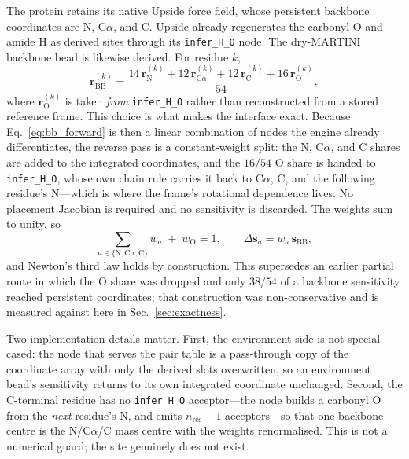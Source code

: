 \documentclass[journal=jctcce,manuscript=article,layout=twocolumn]{achemso}
\begin{document}
The protein retains its native Upside force field, whose persistent backbone
coordinates are N, C$\alpha$, and C. Upside already regenerates the carbonyl O and
amide H as derived sites through its \texttt{infer\_H\_O} node. The dry-MARTINI
backbone bead is likewise derived. For residue $k$,
\begin{equation}
  \mathbf r_\mathrm{BB}^{(k)}=\frac{
  14\,\mathbf r_\mathrm{N}^{(k)}+12\,\mathbf r_{\mathrm{C}\alpha}^{(k)}
  +12\,\mathbf r_\mathrm{C}^{(k)}+16\,\mathbf r_\mathrm{O}^{(k)}}{54},
  \label{eq:bb_forward}
\end{equation}
where $\mathbf r_\mathrm{O}^{(k)}$ is taken \emph{from} \texttt{infer\_H\_O} rather
than reconstructed from a stored reference frame. This choice is what makes the
interface exact. Because Eq.~\ref{eq:bb_forward} is then a linear combination of
nodes the engine already differentiates, the reverse pass is a constant-weight
split: the N, C$\alpha$, and C shares are added to the integrated coordinates, and
the $16/54$ O share is handed to \texttt{infer\_H\_O}, whose own chain rule carries
it back to C$\alpha$, C, and the following residue's N---which is where the frame's
rotational dependence lives. No placement Jacobian is required and no sensitivity is
discarded. The weights sum to unity, so
\begin{equation}
  \sum_{a\in\{\mathrm{N},\mathrm{C}\alpha,\mathrm{C}\}}\!\!\!w_a
  \;+\;w_\mathrm{O}=1,
  \qquad
  \Delta\mathbf s_a = w_a\,\mathbf s_\mathrm{BB},
  \label{eq:bb_reverse}
\end{equation}
and Newton's third law holds by construction. This supersedes an earlier partial
route in which the O share was dropped and only $38/54$ of a backbone sensitivity
reached persistent coordinates; that construction was non-conservative and is
measured against here in Sec.~\ref{sec:exactness}.

Two implementation details matter. First, the environment side is not special-cased:
the node that serves the pair table is a pass-through copy of the coordinate array
with only the derived slots overwritten, so an environment bead's sensitivity returns
to its own integrated coordinate unchanged. Second, the C-terminal residue has no
\texttt{infer\_H\_O} acceptor---the node builds a carbonyl O from the \emph{next}
residue's N, and emits $n_\mathrm{res}-1$ acceptors---so that one backbone centre is
the N/C$\alpha$/C mass centre with the weights renormalised. This is not a numerical
guard; the site genuinely does not exist.
\end{document}
